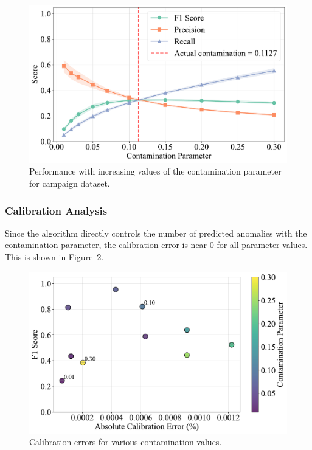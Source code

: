 \documentclass[10pt, conference]{IEEEtran}
\begin{document}
\begin{figure}[H]
	\centering
	\includegraphics[width=0.95\linewidth]{../results/campaign/contamination/performance_vs_contamination.pdf}
	\caption{Performance with increasing values of the contamination parameter for campaign dataset.}
	\label{fig:contamination_campaign}
\end{figure}


\subsubsection{Calibration Analysis}
Since the algorithm directly controls the number of predicted anomalies with the contamination parameter, the calibration error is near 0 for all parameter values. This is shown in Figure~\ref{fig:contamination_shuttle_calibration}.
\begin{figure}[H]
	\centering
	\includegraphics[width=0.95\linewidth]{../results/shuttle/contamination/f1_vs_calibration_error.pdf}
	\caption{Calibration errors for various contamination values.}
	\label{fig:contamination_shuttle_calibration}
\end{figure}
\end{document}
